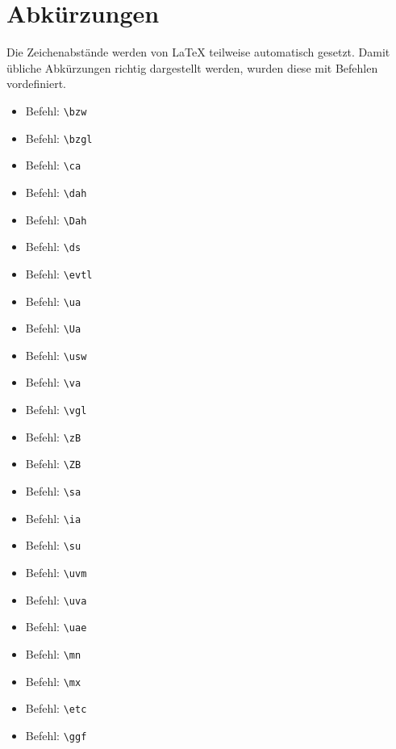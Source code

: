 \newpage
\section{Abkürzungen}
Die Zeichenabstände werden von {\LaTeX} teilweise automatisch gesetzt. Damit übliche Abkürzungen richtig dargestellt werden, wurden diese mit Befehlen vordefiniert.

\begin{multicols}{2}	
	\begin{itemize}
		\item Befehl: \verb|\bzw|\dotfill\bzw
		\item Befehl: \verb|\bzgl|\dotfill\bzgl
		\item Befehl: \verb|\ca|\dotfill\ca
		\item Befehl: \verb|\dah|\dotfill\dah
		\item Befehl: \verb|\Dah|\dotfill\Dah
		\item Befehl: \verb|\ds|\dotfill\ds
		\item Befehl: \verb|\evtl|\dotfill\evtl
		\item Befehl: \verb|\ua|\dotfill\ua
		\item Befehl: \verb|\Ua|\dotfill\Ua
		\item Befehl: \verb|\usw|\dotfill\usw
		\item Befehl: \verb|\va|\dotfill\va
		\item Befehl: \verb|\vgl|\dotfill\vgl
		\item Befehl: \verb|\zB|\dotfill\zB
		\item Befehl: \verb|\ZB|\dotfill\ZB
		\item Befehl: \verb|\sa|\dotfill\sa
		\item Befehl: \verb|\ia|\dotfill\ia
		\item Befehl: \verb|\su|\dotfill\su
		\item Befehl: \verb|\uvm|\dotfill\uvm
		\item Befehl: \verb|\uva|\dotfill\uva
		\item Befehl: \verb|\uae|\dotfill\uae
		\item Befehl: \verb|\mn|\dotfill\mn
		\item Befehl: \verb|\mx|\dotfill\mx
		\item Befehl: \verb|\etc|\dotfill\etc
		\item Befehl: \verb|\ggf|\dotfill\ggf
	\end{itemize}
\end{multicols}

\newpage
